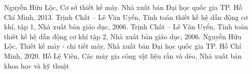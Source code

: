 \documentclass[12pt,a4paper]{report}
\begin{document}
    
    
    \tableofcontents
    \cleardoublepage
    \listoftables
    \listoffigures
    \cleardoublepage
    
    
    
    
    
    
    
    
    
    
    \begin{thebibliography}{9}
        Nguyễn Hữu Lộc, Cơ sở thiết kế máy. Nhà xuất bản Đại học quốc gia TP. Hồ Chí Minh, 2013.
        Trịnh Chất – Lê Văn Uyển, Tính toán thiết kế hệ dẫn động cơ khí, tập 1, Nhà xuất bản giáo dục, 2006.
        Trịnh Chất – Lê Văn Uyển, Tính toán thiết kế hệ dẫn động cơ khí tập 2, Nhà xuất bản giáo dục, 2006.
        Nguyễn Hữu Lộc, Thiết kế máy - chi tiết máy, Nhà xuất bản Đại học quốc gia TP. Hồ Chí Minh, 2020.
        Hồ Lệ Viên, Các máy gia công vật liệu rắn và dẻo, Nhà xuất bản khoa học và kỹ thuật 
        \end{thebibliography}
\end{document}

